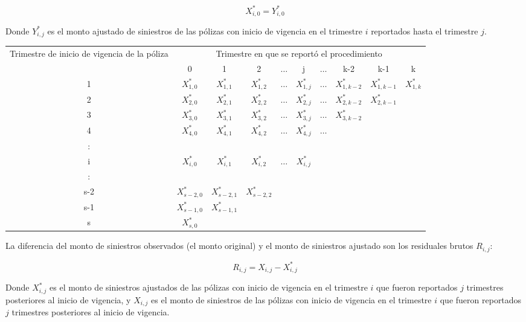 \documentclass[11pt,twoside,openright,spanish]{report}
\numberwithin{equation}{chapter}
\numberwithin{figure}{chapter}
\numberwithin{table}{chapter}
\begin{document}
	$${X}_{i,0}^{*}={Y}_{i,0}^{*}$$ 
	
	Donde ${Y}_{i,j}^{*}$ es el monto ajustado de siniestros de las pólizas con inicio de vigencia en el trimestre $i$ reportados hasta el trimestre $j$. 
	
	\begin{table}[ht]
		\centering
		\begin{tabularx}{\linewidth}{ c|ccccccccc}
		\multirow{2}{4cm}{Trimestre de inicio de vigencia de la póliza}&  \multicolumn{9}{c}{Trimestre en que se reportó el procedimiento} \\
			& 0  & 1 & 2 & $ \dots $ & j & $\dots $ & k-2 & k-1 &  k \\
			\midrule
			1      &  $X_{1,0}^{*}$ & $X_{1,1}^{*}$ & $X_{1,2}^{*}$ & $ \dots $ & $X_{1,j}^{*}$ & $ \dots $ & $X_{1,k-2}^{*}$ & $X_{1,k-1}^{*}$ & $X_{1,k}^{*}$ \\
			2      &  $X_{2,0}^{*}$ & $X_{2,1}^{*}$ & $X_{2,2}^{*}$ & $ \dots $ & $X_{2,j}^{*}$ & $ \dots $ & $X_{2,k-2}^{*}$ & $X_{2,k-1}^{*}$ & \\
			3      &  $X_{3,0}^{*}$ & $X_{3,1}^{*}$ & $X_{3,2}^{*}$ & $ \dots $ & $X_{3,j}^{*}$ & $ \dots $ & $X_{3,k-2}^{*}$ & & \\
			4      &  $X_{4,0}^{*}$ & $X_{4,1}^{*}$ & $X_{4,2}^{*}$ & $ \dots $ & $X_{4,j}^{*}$ & $ \dots $ & & & \\
			:      & & & & & & & & &\\
			i      &  $X_{i,0}^{*}$ & $X_{i,1}^{*}$ & $X_{i,2}^{*}$ & $ \dots $ & $X_{i,j}^{*}$ & & & & \\
			:      & & & & & & & & & \\
			s-2      &  $X_{s-2,0}^{*}$ & $X_{s-2,1}^{*}$ & $X_{s-2,2}^{*}$ & & & & & & \\
			s-1      &  $X_{s-1,0}^{*}$ & $X_{s-1,1}^{*}$ & & & & & & & \\
			s      &  $X_{s,0}^{*}$ & & & & & & & & \\
		\end{tabularx}
	\end{table}
		
	La diferencia del monto de siniestros observados (el monto original) y el monto de siniestros ajustado son los residuales brutos $R_{i,j}^{}$:
		
	$$R_{i,j}^{}= X_{i,j}^{} - X_{i,j}^{*} $$ 
	
	Donde ${X}_{i,j}^{*}$ es el monto de siniestros ajustados de las pólizas con inicio de vigencia en el trimestre $i$ que fueron reportados $j$ trimestres posteriores al inicio de vigencia, y ${X}_{i,j}$ es el monto de siniestros de las pólizas con inicio de vigencia en el trimestre $i$ que fueron reportados $j$ trimestres posteriores al inicio de vigencia.	
	
\end{document}
